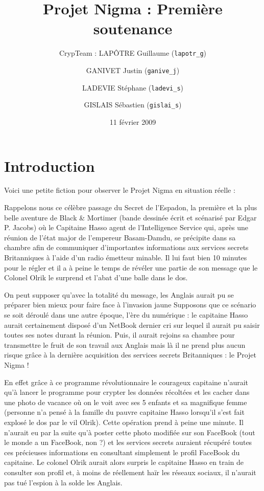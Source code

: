 \documentclass[a4paper,12pt]{article}
\title{Projet Nigma : Première soutenance}
\author{CrypTeam : LAPÔTRE Guillaume (\texttt{lapotr\_g}) \and GANIVET Justin (\texttt{ganive\_j}) \and LADEVIE Stéphane (\texttt{ladevi\_s}) \and GISLAIS Sébastien (\texttt{gislai\_s})}
\date{11 février 2009}
\begin{document}

\maketitle

\newpage

\tableofcontents

\newpage

\section{Introduction}

Voici une petite fiction pour observer le Projet Nigma en situation réelle :

Rappelons nous ce célèbre passage du Secret de l'Espadon, la première et la plus belle aventure de Black \& Mortimer (bande dessinée écrit et scénarisé par Edgar P. Jacobs) où le Capitaine Hasso agent de l'Intelligence Service qui, après une réunion de l'état major de l'empereur Basam-Damdu, se précipite dans sa chambre afin de communiquer d'importantes informations aux services secrets Britanniques à l'aide d'un radio émetteur minable. Il lui faut bien 10 minutes pour le régler et il a à peine le temps de révéler une partie de son message que le Colonel Olrik le surprend et l'abat d'une balle dans le dos.

On peut supposer qu'avec la totalité du message, les Anglais aurait pu se préparer bien mieux pour faire face à l'invasion \og jaune \fg{} Supposons que ce scénario se soit déroulé dans une autre époque, l'ère du numérique : le capitaine Hasso aurait certainement disposé d'un NetBook dernier cri sur lequel il aurait pu saisir toutes ses notes durant la réunion. Puis, il aurait rejoins sa chambre pour transmettre le fruit de son travail aux Anglais mais là il ne prend plus aucun risque grâce à la dernière acquisition des services secrets Britanniques : le Projet Nigma !

En effet grâce à ce programme révolutionnaire le courageux capitaine n'aurait qu'à lancer le programme pour crypter les données récoltées et les cacher dans une photo de vacance où on le voit avec ses 5 enfants et sa magnifique femme (personne n'a pensé à la famille du pauvre capitaine Hasso lorsqu'il s'est fait explosé le dos par le vil Olrik). Cette opération prend à peine une minute. Il n'aurait eu par la suite qu'à poster cette photo modifiée sur son FaceBook (tout le monde a un FaceBook, non ?) et les services secrets auraient récupéré toutes ces précieuses informations en consultant simplement le profil FaceBook du capitaine. Le colonel Olrik aurait alors surpris le capitaine Hasso en train de consulter son profil et, à moins de réellement haïr les réseaux sociaux, il n'aurait pas tué l'espion à la solde les Anglais.
\end{document}
